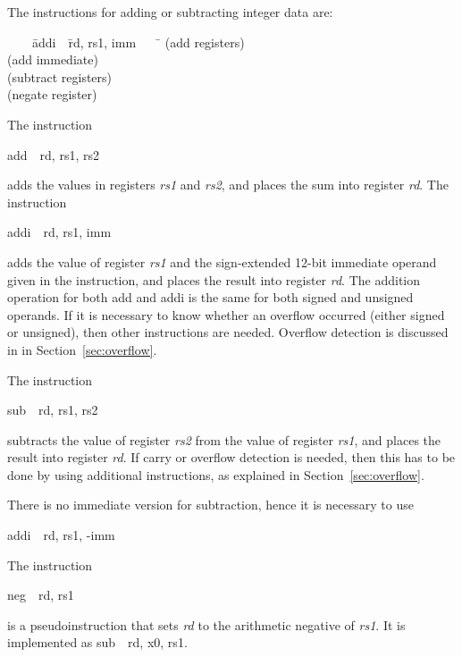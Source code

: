 \documentclass[11pt, twoside, pdftex]{article}
\newenvironment{ctabbing}%
{\begin{center}\begin{minipage}{\textwidth}\begin{tabbing}}
{\end{tabbing}\end{minipage}\end{center}}
\begin{document}
The instructions for adding or subtracting integer data are:
\vspace{-\baselineskip}
\begin{ctabbing}
~~~~\={\sf addi}~~\={\sf rd, rs1, imm}~~~~\=\kill
{}  \>(add registers)\\
  \>(add immediate)\\
  \>(subtract registers)\\
  \>(negate register)
\end{ctabbing}
\newpage
The instruction
\vspace{-\baselineskip}
\begin{center}
{\sf add~~rd, rs1, rs2}
\end{center}
\noindent
adds the values in registers {\it rs1} and {\it rs2}, and places the sum into register {\it rd}.
The instruction
\vspace{-\baselineskip}
\begin{center}
{\sf addi~~rd, rs1, imm}
\end{center}

\noindent
adds the value of register {\it rs1} and the sign-extended 12-bit immediate operand given 
in the instruction, and places the result into register {\it rd}.
The addition operation for both {\sf add} and {\sf addi} is the same for both signed and 
unsigned operands. If it is necessary to know whether an overflow occurred (either signed
or unsigned), then other instructions are needed. Overflow detection is discussed in 
in Section~\ref{sec:overflow}.

\noindent
The instruction
\vspace{-\baselineskip}
\begin{center}
{\sf sub~~rd, rs1, rs2}
\end{center}
\noindent
subtracts the value of register {\it rs2} from the value of register {\it rs1}, and places the 
result into register {\it rd}. If carry or overflow detection is needed, then this has to be 
done by using additional instructions, as explained in Section~\ref{sec:overflow}.

\noindent
There is no immediate version for subtraction, hence it is necessary to use 
\begin{center}
{\sf addi~~rd, rs1, -imm}
\end{center}
\vspace{-\baselineskip}
\noindent
The instruction
\vspace{-\baselineskip}
\begin{center}
{\sf neg~~rd, rs1}
\end{center}
\noindent
is a pseudoinstruction that sets {\it rd} to the arithmetic negative of {\it rs1}. It is
implemented as {\sf sub~~rd, x0, rs1}.
\end{document}
